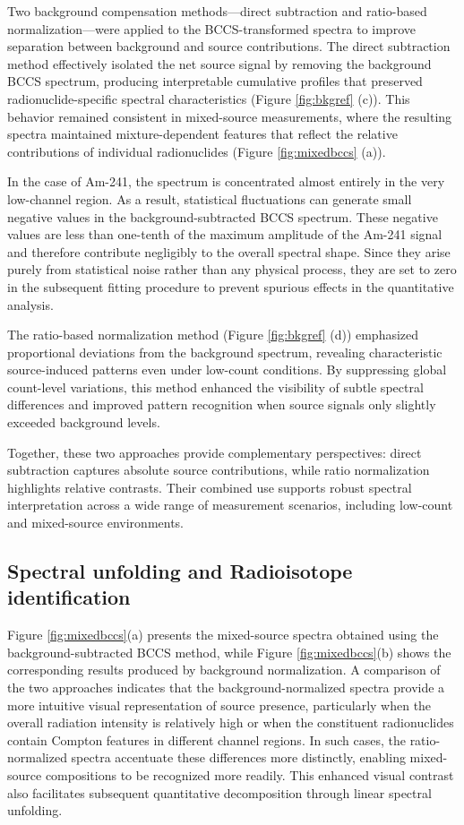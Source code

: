 \documentclass[10pt]{wlscirep}
\begin{document}
Two background compensation methods—direct subtraction and ratio-based normalization—were applied to the BCCS-transformed spectra to improve separation between background and source contributions. The direct subtraction method effectively isolated the net source signal by removing the background BCCS spectrum, producing interpretable cumulative profiles that preserved radionuclide-specific spectral characteristics (Figure \ref{fig:bkgref} (c)). This behavior remained consistent in mixed-source measurements, where the resulting spectra maintained mixture-dependent features that reflect the relative contributions of individual radionuclides (Figure \ref{fig:mixedbccs} (a)). 

In the case of Am-241, the spectrum is concentrated almost entirely in the very low-channel region. As a result, statistical fluctuations can generate small negative values in the background-subtracted BCCS spectrum. These negative values are less than one-tenth of the maximum amplitude of the Am-241 signal and therefore contribute negligibly to the overall spectral shape. Since they arise purely from statistical noise rather than any physical process, they are set to zero in the subsequent fitting procedure to prevent spurious effects in the quantitative analysis. 

The ratio-based normalization method (Figure \ref{fig:bkgref} (d)) emphasized proportional deviations from the background spectrum, revealing characteristic source-induced patterns even under low-count conditions. By suppressing global count-level variations, this method enhanced the visibility of subtle spectral differences and improved pattern recognition when source signals only slightly exceeded background levels.

Together, these two approaches provide complementary perspectives: direct subtraction captures absolute source contributions, while ratio normalization highlights relative contrasts. Their combined use supports robust spectral interpretation across a wide range of measurement scenarios, including low-count and mixed-source environments.

\subsection*{Spectral unfolding and Radioisotope identification}

Figure \ref{fig:mixedbccs}(a) presents the mixed-source spectra obtained using the background-subtracted BCCS method, while Figure \ref{fig:mixedbccs}(b) shows the corresponding results produced by background normalization. A comparison of the two approaches indicates that the background-normalized spectra provide a more intuitive visual representation of source presence, particularly when the overall radiation intensity is relatively high or when the constituent radionuclides contain Compton features in different channel regions. In such cases, the ratio-normalized spectra accentuate these differences more distinctly, enabling mixed-source compositions to be recognized more readily. This enhanced visual contrast also facilitates subsequent quantitative decomposition through linear spectral unfolding.
\end{document}
